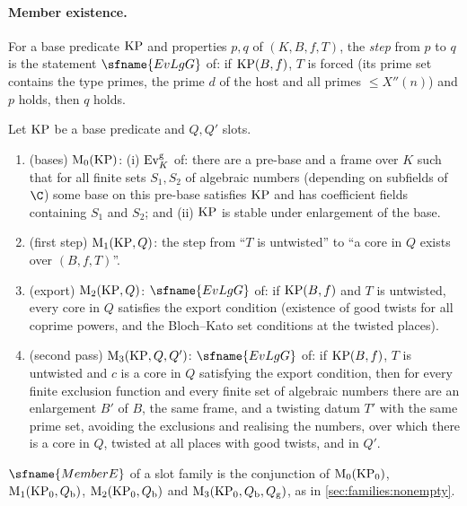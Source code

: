 \paragraph{Member existence.}
For a base predicate $\mathrm{KP}$ and properties $p,q$ of $(K,B,f,T)$, the \emph{step} from $p$ to $q$ is the statement
$\sfname{EvLgG}$ of: if $\mathrm{KP}(B,f)$, $T$ is forced (its prime set contains the type primes, the prime $d$ of the host
and all primes $\le X''(n)$) and $p$ holds, then $q$ holds.

\begin{definition}\label{pf:stageU:memberE}
Let $\mathrm{KP}$ be a base predicate and $Q,Q'$ slots.
\begin{enumerate}[label=(M\arabic*),start=0]
\item (bases) $\mathrm{M}_0(\mathrm{KP})$: (i) $\mathrm{Ev}^{\mathrm g}_K$ of: there are a pre-base and a frame over $K$ such that
for all finite sets $S_1,S_2$ of algebraic numbers (depending on subfields of $\C$) some base on this pre-base satisfies
$\mathrm{KP}$ and has coefficient fields containing $S_1$ and $S_2$; and (ii) $\mathrm{KP}$ is stable under enlargement of
the base.
\item (first step) $\mathrm{M}_1(\mathrm{KP},Q)$: the step from ``$T$ is untwisted'' to ``a core in $Q$ exists over
$(B,f,T)$''.
\item (export) $\mathrm{M}_2(\mathrm{KP},Q)$: $\sfname{EvLgG}$ of: if $\mathrm{KP}(B,f)$ and $T$ is untwisted, every core in $Q$
satisfies the export condition (existence of good twists for all coprime powers, and the Bloch--Kato set conditions at
the twisted places).
\item (second pass) $\mathrm{M}_3(\mathrm{KP},Q,Q')$: $\sfname{EvLgG}$ of: if $\mathrm{KP}(B,f)$, $T$ is untwisted and $c$ is a
core in $Q$ satisfying the export condition, then for every finite exclusion function and every finite set of
algebraic numbers there are an enlargement $B'$ of $B$, the same frame, and a twisting datum $T'$ with the same prime
set, avoiding the exclusions and realising the numbers, over which there is a core in $Q$, twisted at all places with
good twists, and in $Q'$.
\end{enumerate}
$\sfname{MemberE}$ of a slot family is the conjunction of $\mathrm{M}_0(\mathrm{KP}_0)$, $\mathrm{M}_1(\mathrm{KP}_0,Q_{\mathrm b})$,
$\mathrm{M}_2(\mathrm{KP}_0,Q_{\mathrm b})$ and $\mathrm{M}_3(\mathrm{KP}_0,Q_{\mathrm b},Q_{\mathrm g})$, as in
\cref{sec:families:nonempty}.
\end{definition}

